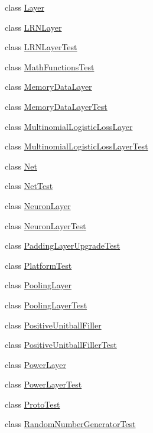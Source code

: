 \begin{DoxyCompactItemize}
\item 
class \hyperlink{classcaffe_1_1_layer}{Layer}
\item 
class \hyperlink{classcaffe_1_1_l_r_n_layer}{L\+R\+N\+Layer}
\item 
class \hyperlink{classcaffe_1_1_l_r_n_layer_test}{L\+R\+N\+Layer\+Test}
\item 
class \hyperlink{classcaffe_1_1_math_functions_test}{Math\+Functions\+Test}
\item 
class \hyperlink{classcaffe_1_1_memory_data_layer}{Memory\+Data\+Layer}
\item 
class \hyperlink{classcaffe_1_1_memory_data_layer_test}{Memory\+Data\+Layer\+Test}
\item 
class \hyperlink{classcaffe_1_1_multinomial_logistic_loss_layer}{Multinomial\+Logistic\+Loss\+Layer}
\item 
class \hyperlink{classcaffe_1_1_multinomial_logistic_loss_layer_test}{Multinomial\+Logistic\+Loss\+Layer\+Test}
\item 
class \hyperlink{classcaffe_1_1_net}{Net}
\item 
class \hyperlink{classcaffe_1_1_net_test}{Net\+Test}
\item 
class \hyperlink{classcaffe_1_1_neuron_layer}{Neuron\+Layer}
\item 
class \hyperlink{classcaffe_1_1_neuron_layer_test}{Neuron\+Layer\+Test}
\item 
class \hyperlink{classcaffe_1_1_padding_layer_upgrade_test}{Padding\+Layer\+Upgrade\+Test}
\item 
class \hyperlink{classcaffe_1_1_platform_test}{Platform\+Test}
\item 
class \hyperlink{classcaffe_1_1_pooling_layer}{Pooling\+Layer}
\item 
class \hyperlink{classcaffe_1_1_pooling_layer_test}{Pooling\+Layer\+Test}
\item 
class \hyperlink{classcaffe_1_1_positive_unitball_filler}{Positive\+Unitball\+Filler}
\item 
class \hyperlink{classcaffe_1_1_positive_unitball_filler_test}{Positive\+Unitball\+Filler\+Test}
\item 
class \hyperlink{classcaffe_1_1_power_layer}{Power\+Layer}
\item 
class \hyperlink{classcaffe_1_1_power_layer_test}{Power\+Layer\+Test}
\item 
class \hyperlink{classcaffe_1_1_proto_test}{Proto\+Test}
\item 
class \hyperlink{classcaffe_1_1_random_number_generator_test}{Random\+Number\+Generator\+Test}

\end{DoxyCompactItemize}
